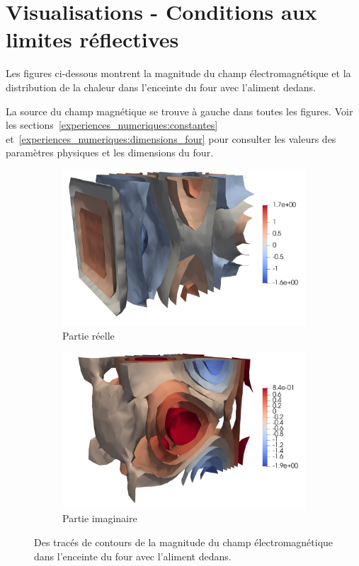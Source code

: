 \section{Visualisations - Conditions aux limites réflectives}

Les figures ci-dessous montrent la magnitude du champ électromagnétique
et la distribution de la chaleur dans l'enceinte du four avec l'aliment
dedans.

La source du champ magnétique se trouve à gauche dans toutes les
figures. Voir les sections~\ref{experiences_numeriques:constantes}
et~\ref{experiences_numeriques:dimensions_four} pour consulter
les valeurs des paramètres physiques et les dimensions du four.


\begin{figure}[H]
    \centering
    \begin{subfigure}{.5\textwidth}
        \centering
        \includegraphics[scale=0.15]{figures/helmholtz/helmholtz_reel_reflexion1.png}
        \caption{Partie réelle}
    \end{subfigure}%
    \begin{subfigure}{.5\textwidth}
        \centering
        \includegraphics[scale=0.15]{figures/helmholtz/helmholtz_imag_reflexion1.png}
        \caption{Partie imaginaire}
    \end{subfigure}
    \caption{Des tracés de contours de la magnitude du champ électromagnétique
    dans l'enceinte du four avec l'aliment dedans.}
\end{figure}

